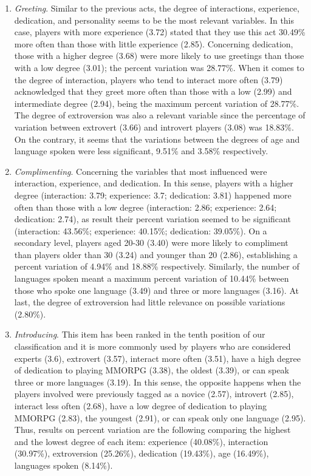 \documentclass[english]{textolivre}
\begin{document}
\begin{enumerate}
\item \emph{Greeting}. Similar to the previous acts, the degree of interactions, experience, dedication, and personality seems to be the most relevant variables. In this case, players with more experience (3.72) stated that they use this act 30.49\% more often than those with little experience (2.85). Concerning dedication, those with a higher degree (3.68) were more likely to use greetings than those with a low degree (3.01); the percent variation was 28.77\%. When it comes to the degree of interaction, players who tend to interact more often (3.79) acknowledged that they greet more often than those with a low (2.99) and intermediate degree (2.94), being the maximum percent variation of 28.77\%. The degree of extroversion was also a relevant variable since the percentage of variation between extrovert (3.66) and introvert players (3.08) was 18.83\%. On the contrary, it seems that the variations between the degrees of age and language spoken were less significant, 9.51\% and 3.58\% respectively. 
\item \emph{Complimenting}. Concerning the variables that most influenced were interaction, experience, and dedication. In this sense, players with a higher degree (interaction: 3.79; experience: 3.7; dedication: 3.81) happened more often than those with a low degree (interaction: 2.86; experience: 2.64; dedication: 2.74), as result their percent variation seemed to be significant (interaction: 43.56\%; experience: 40.15\%; dedication: 39.05\%). On a secondary level, players aged 20-30 (3.40) were more likely to compliment than players older than 30 (3.24) and younger than 20 (2.86), establishing a percent variation of 4.94\% and 18.88\% respectively. Similarly, the number of languages spoken meant a maximum percent variation of 10.44\% between those who spoke one language (3.49) and three or more languages (3.16). At last, the degree of extroversion had little relevance on possible variations (2.80\%).
\item \emph{Introducing}. This item has been ranked in the tenth position of our classification and it is more commonly used by players who are considered experts (3.6), extrovert (3.57), interact more often (3.51), have a high degree of dedication to playing MMORPG (3.38), the oldest (3.39), or can speak three or more languages (3.19). In this sense, the opposite happens when the players involved were previously tagged as a novice (2.57), introvert (2.85), interact less often (2.68), have a low degree of dedication to playing MMORPG (2.83), the youngest (2.91), or can speak only one language (2.95). Thus, results on percent variation are the following comparing the highest and the lowest degree of each item: experience (40.08\%), interaction (30.97\%), extroversion (25.26\%), dedication (19.43\%), age (16.49\%), languages spoken (8.14\%). 

\end{enumerate}
\end{document}
